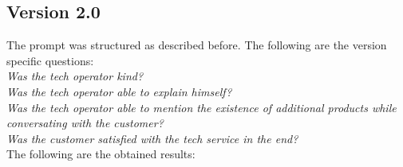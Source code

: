 \subsection{Version 2.0}
The prompt was structured as described before. The following are the version specific questions:\\

\textit{Was the tech operator kind?\\
      Was the tech operator able to explain himself?\\
      Was the tech operator able to mention the existence of additional products while conversating with the customer?\\
      Was the customer satisfied with the tech service in the end?
}\\

The following are the obtained results:\\
